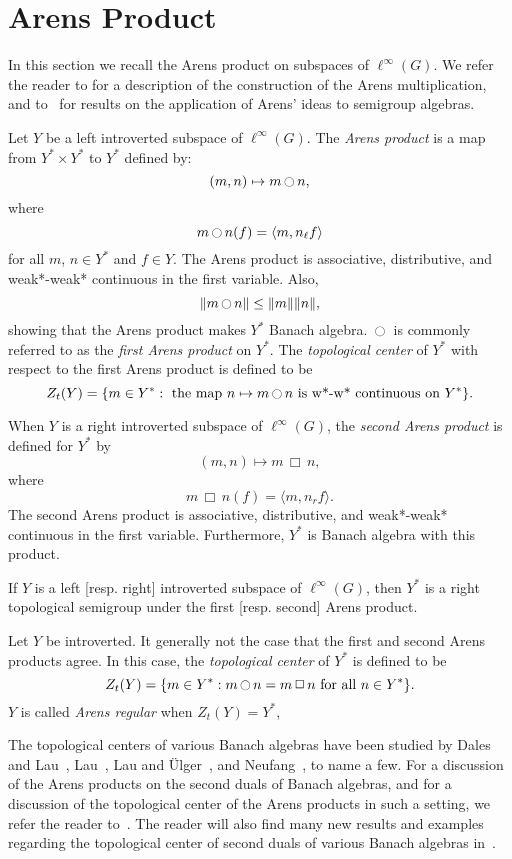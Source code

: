
\section{Arens Product}
In this section we recall the Arens product on subspaces
of $\ell^\infty(G)$.  We refer the reader to \cite{arens} for a description of the construction
of the Arens multiplication, and to~\cite[\S 6]{day:first} for results on the application
of Arens' ideas to semigroup algebras.

Let $Y$ be a left introverted subspace of $\ell^\infty(G)$.
The {\it Arens product} is a map from $Y^* \times Y^*$ to $Y^*$ defined by:
\[
(m,n) \mapsto m\oodot n,
\]
where
\[
m\oodot n(f) = \langle m, n_\ell f\rangle
\]
for all $m$, $n\in Y^*$ and $f\in Y$.
The Arens product is associative, distributive, and weak*-weak*
continuous in the first variable.
Also,
\[
\|m\oodot n\| \leq \|m\|\|n\|,
\]
showing that the Arens product
makes $Y^*$ Banach algebra.  $\oodot$ is commonly referred to as the {\it first Arens product} on $Y^*$.
The {\it topological center} of $Y^*$ with respect to the first Arens product is defined to be
\[
Z_t(Y) = \{m\in Y^*:\text{ the map }n\mapsto m\oodot n\text{ is w*-w* continuous on }Y^*\}.
\]

When $Y$ is a right introverted subspace of $\ell^\infty(G)$,
the {\it second Arens product} is defined for $Y^*$ by
\[
(m,n) \mapsto m\,\Box\,n,
\]
where
\[
m\,\Box\,n(f) = \langle m, n_r f\rangle.
\]
The second Arens product is associative, distributive, and weak*-weak*
continuous in the first variable.  Furthermore, $Y^*$ is Banach algebra
with this product.

If $Y$ is a left [resp. right] introverted subspace of $\ell^\infty(G)$, then
$Y^*$ is a right topological semigroup under the first [resp. second] Arens product.

Let $Y$ be introverted.
It generally not the case that the first and second Arens products agree.
In this case, the {\it topological center} of $Y^*$ is defined to be
\[
Z_t(Y) = \{m\in Y^*:m\oodot n = m\,\Box\,n\text{ for all }n\in Y^*\}.
\]
$Y$ is called {\it Arens regular} when $Z_t(Y) = Y^*$,

The topological centers of various Banach algebras have been studied by
Dales and Lau~\cite{lau&dales}, Lau~\cite{lau:arens},
Lau and \"{U}lger~\cite{lau&ulger}, and Neufang~\cite{neufang}, to name a few.
For a discussion of the Arens products on the second
duals of Banach algebras, and for a discussion of the topological center of the Arens products in such a setting,
we refer the reader to~\cite{lau&ulger}.
The reader will also find many new results and examples regarding the topological center
of second duals of various Banach algebras in~\cite{lau&dales}.

